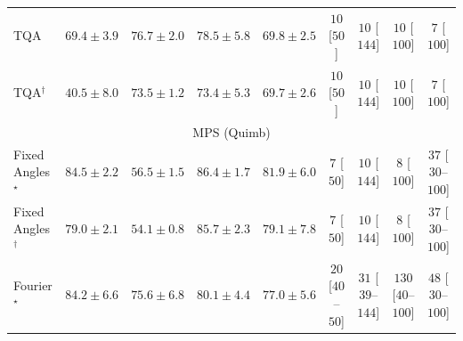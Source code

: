 \begin{tabular}{l|cccc|cccc|}
TQA & {\cellcolor[HTML]{8C7CB9}} \color[HTML]{F1F1F1} $69.4\pm 3.9$ & {\cellcolor[HTML]{894CA2}} \color[HTML]{F1F1F1} $76.7\pm 2.0$ & {\cellcolor[HTML]{88409C}} \color[HTML]{F1F1F1} $78.5\pm 5.8$ & {\cellcolor[HTML]{8C79B8}} \color[HTML]{F1F1F1} $69.8\pm 2.5$ & {\cellcolor[HTML]{FFF7F3}} \color[HTML]{000000} $10$ [$50$] & {\cellcolor[HTML]{FFF7F3}} \color[HTML]{000000} $10$ [$144$] & {\cellcolor[HTML]{FFF7F3}} \color[HTML]{000000} $10$ [$100$] & {\cellcolor[HTML]{FFF7F3}} \color[HTML]{000000} $7$ [$100$] \\
TQA$^\dagger$ & {\cellcolor[HTML]{F2F8FB}} \color[HTML]{000000} $40.5\pm 8.0$ & {\cellcolor[HTML]{8B61AC}} \color[HTML]{F1F1F1} $73.5\pm 1.2$ & {\cellcolor[HTML]{8B61AC}} \color[HTML]{F1F1F1} $73.4\pm 5.3$ & {\cellcolor[HTML]{8C79B8}} \color[HTML]{F1F1F1} $69.7\pm 2.6$ & {\cellcolor[HTML]{FFF7F3}} \color[HTML]{000000} $10$ [$50$] & {\cellcolor[HTML]{FFF7F3}} \color[HTML]{000000} $10$ [$144$] & {\cellcolor[HTML]{FFF7F3}} \color[HTML]{000000} $10$ [$100$] & {\cellcolor[HTML]{FFF7F3}} \color[HTML]{000000} $7$ [$100$] \\
\cline{1-9}
\multicolumn{9}{c}{\rule{0pt}{8pt}MPS (Quimb)} \\
\midrule
Fixed Angles$^\star$ & {\cellcolor[HTML]{9C3604}} \color[HTML]{F1F1F1} $84.5\pm 2.2$ & {\cellcolor[HTML]{FECE65}} \color[HTML]{000000} $56.5\pm 1.5$ & {\cellcolor[HTML]{8E3104}} \color[HTML]{F1F1F1} $86.4\pm 1.7$ & {\cellcolor[HTML]{B13F03}} \color[HTML]{F1F1F1} $81.9\pm 6.0$ & {\cellcolor[HTML]{FFF7F3}} \color[HTML]{000000} $7$ [$50$] & {\cellcolor[HTML]{FFF7F3}} \color[HTML]{000000} $10$ [$144$] & {\cellcolor[HTML]{FFF7F3}} \color[HTML]{000000} $8$ [$100$] & {\cellcolor[HTML]{FEF1ED}} \color[HTML]{000000} $37$ [$30$--$100$] \\
Fixed Angles$^\dagger$ & {\cellcolor[HTML]{C84A02}} \color[HTML]{F1F1F1} $79.0\pm 2.1$ & {\cellcolor[HTML]{FEDA7E}} \color[HTML]{000000} $54.1\pm 0.8$ & {\cellcolor[HTML]{933204}} \color[HTML]{F1F1F1} $85.7\pm 2.3$ & {\cellcolor[HTML]{C64902}} \color[HTML]{F1F1F1} $79.1\pm 7.8$ & {\cellcolor[HTML]{FFF7F3}} \color[HTML]{000000} $7$ [$50$] & {\cellcolor[HTML]{FFF7F3}} \color[HTML]{000000} $10$ [$144$] & {\cellcolor[HTML]{FFF7F3}} \color[HTML]{000000} $8$ [$100$] & {\cellcolor[HTML]{FEF1ED}} \color[HTML]{000000} $37$ [$30$--$100$] \\
Fourier$^\star$ & {\cellcolor[HTML]{A03704}} \color[HTML]{F1F1F1} $84.2\pm 6.6$ & {\cellcolor[HTML]{D95B09}} \color[HTML]{F1F1F1} $75.6\pm 6.8$ & {\cellcolor[HTML]{BE4503}} \color[HTML]{F1F1F1} $80.1\pm 4.4$ & {\cellcolor[HTML]{D35406}} \color[HTML]{F1F1F1} $77.0\pm 5.6$ & {\cellcolor[HTML]{FFF4F0}} \color[HTML]{000000} $20$ [$40$--$50$] & {\cellcolor[HTML]{FFF2EE}} \color[HTML]{000000} $31$ [$39$--$144$] & {\cellcolor[HTML]{FDDBD7}} \color[HTML]{000000} $130$ [$40$--$100$] & {\cellcolor[HTML]{FEEEEB}} \color[HTML]{000000} $48$ [$30$--$100$] \\

\end{tabular}
